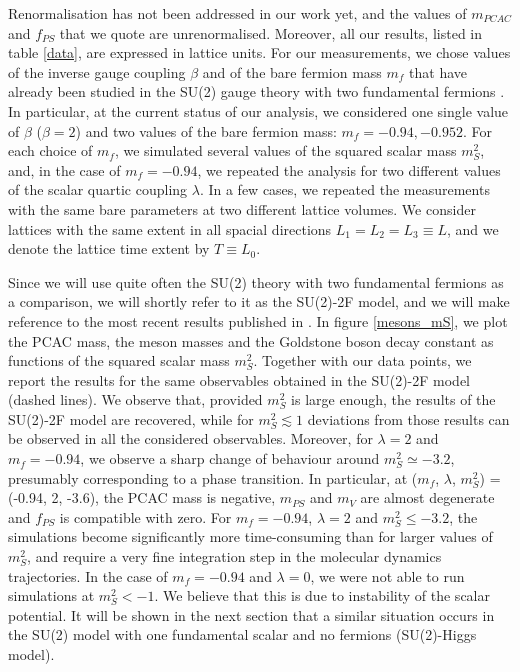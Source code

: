 Renormalisation has not been addressed in our work yet, and the values of $m_{PCAC}$ and $f_{PS}$ that we quote are unrenormalised. Moreover, all our results, listed in table \ref{data}, are expressed in lattice units. For our measurements, we chose values of the inverse gauge coupling $\beta$ and of the bare fermion mass $m_f$ that have already been studied in the SU(2) gauge theory with two fundamental fermions \cite{Arthur:2016dir}. In particular, at the current status of our analysis, we considered one single value of $\beta$ ($\beta = 2$) and two values of the bare fermion mass: $m_f = -0.94, -0.952$. For each choice of $m_f$, we simulated several values of the squared scalar mass $m_S^2$, and, in the case of $m_f = -0.94$, we repeated the analysis for two different values of the scalar quartic coupling $\lambda$. In a few cases, we repeated the measurements with the same bare parameters at two different lattice volumes. We consider lattices with the same extent in all spacial directions $L_1 = L_2 = L_3 \equiv L$, and we denote the lattice time extent by $T \equiv L_0$. 

Since we will use quite often the SU(2) theory with two fundamental fermions as a comparison, we will shortly refer to it as the SU(2)-2F model, and we will make reference to the most recent results published in \cite{Arthur:2016dir}.
In figure \ref{mesons_mS}, we plot the PCAC mass, the meson masses and the Goldstone boson decay constant as functions of the squared scalar mass $m_S^2$. Together with our data points, we report the results for the same observables obtained in the SU(2)-2F model (dashed lines).  We observe that, provided $m_S^2$ is large enough, the results of the SU(2)-2F model are recovered, while for $m_S^2 \lesssim 1$ deviations from those results can be observed in all the considered observables. Moreover, for $\lambda = 2$ and $m_f = -0.94$, we observe a sharp change of behaviour around $m_S^2 \simeq -3.2$, presumably corresponding to a phase transition. In particular, at ($m_f$, $\lambda$, $m_S^2$) = (-0.94, 2, -3.6), the PCAC mass is negative, $m_{PS}$ and $m_V$ are almost degenerate and $f_{PS}$ is compatible with zero. For $m_f = -0.94$, $\lambda = 2$ and $m_S^2 \leq -3.2$, the simulations become significantly more time-consuming than for larger values of $m_S^2$, and require a very fine integration step in the molecular dynamics trajectories. In the case of $m_f = -0.94$ and $\lambda = 0$, we were not able to run simulations at $m_S^2 < -1$. We believe that this is due to instability of the scalar potential. It will be shown in the next section that a similar situation occurs in the SU(2) model with one fundamental scalar and no fermions (SU(2)-Higgs model).



